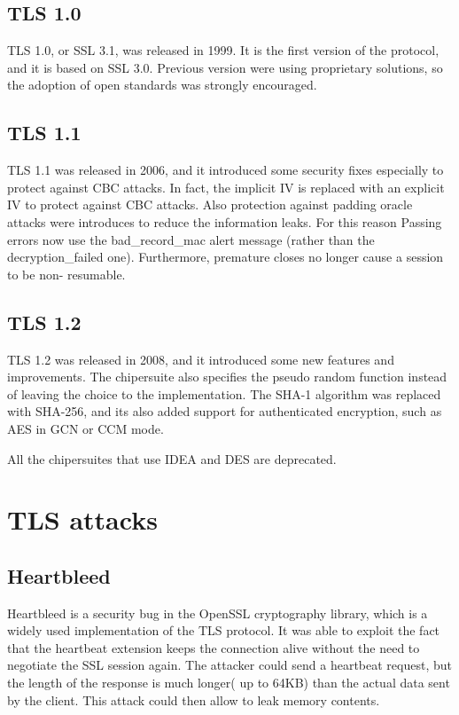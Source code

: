 \subsection{TLS 1.0}
TLS 1.0, or SSL 3.1, was released in 1999. It is the first version of
the protocol, and it is based on SSL 3.0. Previous version were using
proprietary solutions, so the adoption of open standards was strongly
encouraged.

\subsection{TLS 1.1}
TLS 1.1 was released in 2006, and it introduced some security fixes
especially to protect against CBC attacks. In fact, the implicit
IV is replaced with an explicit IV to protect against CBC attacks.
Also protection against padding oracle attacks were introduces to
reduce the information leaks. For this reason Passing errors now use
the bad\_record\_mac alert message (rather than the decryption\_failed
one). Furthermore, premature closes no longer cause a session to be non-
resumable.

\subsection{TLS 1.2}
TLS 1.2 was released in 2008, and it introduced some new features and 
improvements. The chipersuite also specifies the pseudo random
function instead of leaving the choice to the implementation. The
SHA-1 algorithm was replaced with SHA-256, and its also added support
for authenticated encryption, such as AES in GCN or CCM mode.

All the chipersuites that use IDEA and DES are deprecated.

\section{TLS attacks}
\subsection{Heartbleed}
Heartbleed is a security bug in the OpenSSL cryptography library,
which is a widely used implementation of the TLS protocol. It was able
to exploit the fact that the heartbeat extension keeps the connection
alive without the need to negotiate the SSL session again. The
attacker could send a heartbeat request, but the length of the 
response is much longer( up to 64KB) than the actual data sent by the
client. This attack could then allow to leak memory contents.

